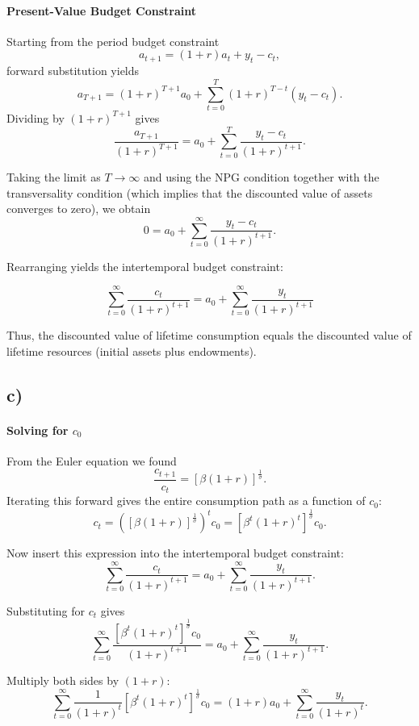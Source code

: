\documentclass[12pt]{article}
\begin{document}
\paragraph{Present-Value Budget Constraint}

Starting from the period budget constraint
\[
a_{t+1} = (1+r)a_t + y_t - c_t,
\]
forward substitution yields
\[
a_{T+1}
=
(1+r)^{T+1} a_0
+
\sum_{t=0}^{T} (1+r)^{T-t} (y_t - c_t).
\]
Dividing by $(1+r)^{T+1}$ gives
\[
\frac{a_{T+1}}{(1+r)^{T+1}}
=
a_0
+
\sum_{t=0}^{T} \frac{y_t - c_t}{(1+r)^{t+1}}.
\]

Taking the limit as $T \to \infty$ and using the NPG condition together with the transversality condition (which implies that the discounted value of assets converges to zero), we obtain
\[
0
=
a_0
+
\sum_{t=0}^{\infty} \frac{y_t - c_t}{(1+r)^{t+1}}.
\]

Rearranging yields the intertemporal budget constraint:

$$\boxed{\sum_{t=0}^{\infty} \frac{c_t}{(1+r)^{t+1}}=a_0+\sum_{t=0}^{\infty} \frac{y_t}{(1+r)^{t+1}}}
$$

Thus, the discounted value of lifetime consumption equals the discounted value of lifetime resources (initial assets plus endowments).

\subsection{c)}

\paragraph{Solving for $c_0$}

From the Euler equation we found
\[
\frac{c_{t+1}}{c_t} = [\beta(1+r)]^{\frac{1}{\sigma}}.
\]
Iterating this forward gives the entire consumption path as a function of $c_0$:
\[
c_t = \left([\beta(1+r)]^{\frac{1}{\sigma}}\right)^t c_0
= [\beta^t (1+r)^t]^{\frac{1}{\sigma}} c_0.
\]

Now insert this expression into the intertemporal budget constraint:
\[
\sum_{t=0}^{\infty} \frac{c_t}{(1+r)^{t+1}}
=
a_0
+
\sum_{t=0}^{\infty} \frac{y_t}{(1+r)^{t+1}}.
\]

Substituting for $c_t$ gives
\[
\sum_{t=0}^{\infty} 
\frac{[\beta^t (1+r)^t]^{\frac{1}{\sigma}} c_0}
{(1+r)^{t+1}}
=
a_0
+
\sum_{t=0}^{\infty} \frac{y_t}{(1+r)^{t+1}}.
\]

Multiply both sides by $(1+r)$:
\[
\sum_{t=0}^{\infty} 
\frac{1}{(1+r)^t}
[\beta^t (1+r)^t]^{\frac{1}{\sigma}} c_0
=
(1+r)a_0
+
\sum_{t=0}^{\infty} \frac{y_t}{(1+r)^t}.
\]
\end{document}
